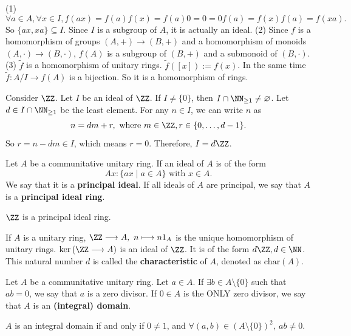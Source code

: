 \begin{proofenv}
    \quad \newline
    (1) $$\forall a\in A,\forall x\in I, f(ax)=f(a)f(x)=f(a)0=0=0f(a)=f(x)f(a)=f(xa).$$
    So $\{ax,xa\}\subseteq I$. Since $I$ is a subgroup of $A$, it is actually an ideal.
    \newline
    (2) Since $f$ is a homomorphism of groups $(A,+)\longrightarrow(B,+)$ and a homomorphism of monoids $(A,\cdot)\longrightarrow(B,\cdot)$, $f(A)$ is a subgroup of $(B,+)$ and a submonoid of $(B,\cdot)$.
    \newline
    (3) $\tilde{f}$ is a homomorphism of unitary rings. $\tilde{f}([x]):=f(x)$. In the same time $\tilde{f}:A/I\longrightarrow f(A)$ is a bijection. So it is a homomorphism of rings.
\end{proofenv}
\begin{exampleenv}
    Consider $\ZZ$. Let $I$ be an ideal of $\ZZ$. If $I\not=\{0\}$, then $I\cap\NN_{\ge1}\not=\varnothing$. Let $d\in I\cap\NN_{\ge1}$ be the least element. For any $n\in I$, we can write $n$ as 
    $$n=dm+r,\text{ where }m\in\ZZ,r\in \{0,\dots,d-1\}.$$
    So $r=n-dm\in I$, which means $r=0$. Therefore, $I=d\ZZ$.
\end{exampleenv}
\begin{definitionenv}
    Let $A$ be a communitative unitary ring. If an ideal of $A$ is of the form 
    $$Ax:\{ax\mid a\in A\}\text{ with }x\in A.$$
    We say that it is a \textbf{principal ideal}. If all ideals of $A$ are principal, we say that $A$ is a \textbf{principal ideal ring}. 
\end{definitionenv}
\begin{exampleenv}
    $\ZZ$ is a principal ideal ring.
\end{exampleenv}
\begin{remark}
    If $A$ is a unitary ring, $\ZZ\longrightarrow A,\ n\longmapsto n1_A$ is the unique homomorphism of unitary rings. $\ker\left(\ZZ\longrightarrow A\right)$ is an ideal of $\ZZ$. It is of the form $d\ZZ,d\in \NN$. This natural number $d$ is called the \textbf{characteristic} of $A$, denoted as $\mathrm{char}(A)$.
\end{remark}
\begin{definitionenv}
    Let $A$ be a communitative unitary ring. Let $a\in A$. If $\exists b\in A\setminus\{0\}$ such that $ab=0$, we say that $a$ is a zero divisor. If $0\in A$ is the ONLY zero divisor, we say that $A$ is an \textbf{(integral) domain}.
\end{definitionenv}
\begin{box2}
    $A$ is an integral domain if and only if $0\not=1$, and $\forall(a,b)\in \left(A\setminus\{0\}\right)^2,\ ab\not=0$.
\end{box2}
